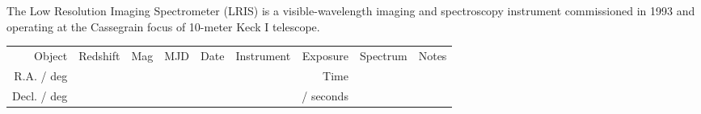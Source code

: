 \documentclass[a4paper,fleqn,usenatbib]{mnras}
\begin{document}
The Low Resolution Imaging Spectrometer (LRIS) is a visible-wavelength
imaging and spectroscopy instrument commissioned in 1993 and operating
at the Cassegrain focus of 10-meter Keck I telescope. 

\begin{table}
 \centering
 \begin{tabular}{r  r  r r r   r r r r}
  \hline \hline 
   Object                         & \multirow{3}{*}{Redshift} & \multirow{3}{*}{Mag}      & \multirow{3}{*}{MJD} & \multirow{3}{*}{Date}  & \multirow{3}{*}{Instrument}   & Exposure    & \multirow{3}{*}{Spectrum} & \multirow{3}{*}{Notes} \\
   R.A. / deg                   &               &               &            &                                &                                                                       &  Time         & & \\
   Decl. / deg                 &               &               &            &                                &                                                                       &  / seconds         & & \\


\end{tabular}
\end{table}
\end{document}
